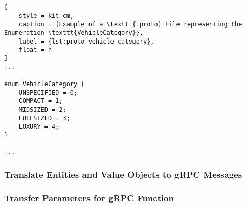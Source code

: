 \begin{lstlisting}[
    style = kit-cm,
    caption = {Example of a \texttt{.proto} File representing the Enumeration \texttt{VehicleCategory}},
    label = {lst:proto_vehicle_category},
    float = h
]
...

enum VehicleCategory {
    UNSPECIFIED = 0;
    COMPACT = 1;
    MIDSIZED = 2;
    FULLSIZED = 3;
    LUXURY = 4;
}

...
\end{lstlisting}
\subsubsection*{Translate Entities and Value Objects to gRPC Messages}

\subsubsection*{Transfer Parameters for gRPC Function}